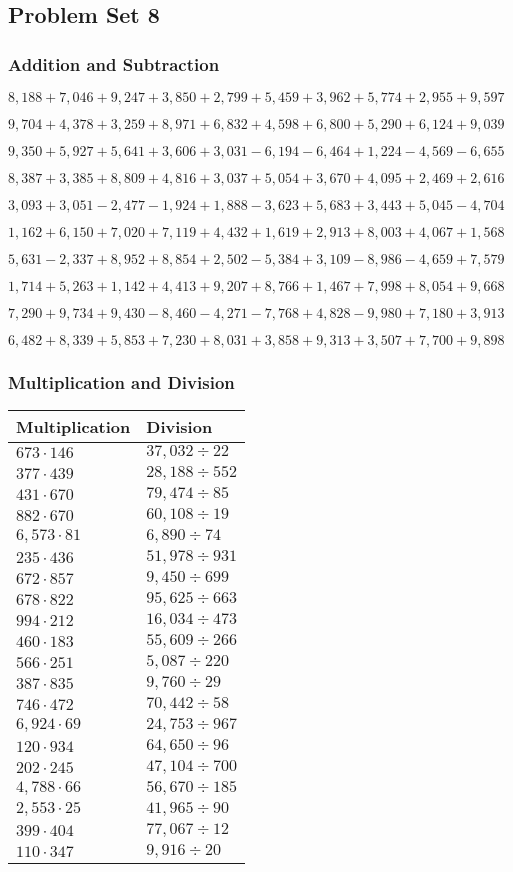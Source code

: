 \hypertarget{problem-set-8-3}{%
\subsection{Problem Set 8}\label{problem-set-8-3}}

\hypertarget{addition-and-subtraction-170}{%
\subsubsection{Addition and
Subtraction}\label{addition-and-subtraction-170}}

\(8,188+7,046+9,247+3,850+2,799+5,459+3,962+5,774+2,955+ 9,597\)

\(9,704+4,378+3,259+8,971+6,832+4,598+6,800+5,290+6,124+9,039\)

\(9,350+5,927+5,641+3,606+3,031-6,194-6,464+1,224-4,569-6,655\)

\(8,387+3,385+8,809+4,816+3,037+5,054+3,670+4,095+2,469+2,616\)

\(3,093+3,051-2,477-1,924+1,888-3,623+5,683+3,443+5,045-4,704\)

\(1,162+6,150+7,020+7,119+4,432+1,619+2,913+8,003+4,067+1,568\)

\(5,631-2,337+8,952+8,854+2,502-5,384+3,109-8,986-4,659+7,579\)

\(1,714+5,263+1,142+4,413+9,207+8,766+1,467+7,998+8,054+9,668\)

\(7,290+9,734+9,430-8,460-4,271-7,768+4,828-9,980+7,180+3,913\)

\(6,482+8,339+5,853+7,230+8,031+3,858+9,313+3,507+7,700+9,898\)

\hypertarget{multiplication-and-division-169}{%
\subsubsection{Multiplication and
Division}\label{multiplication-and-division-169}}

\begin{longtable}[]{@{}ll@{}}
\toprule
Multiplication & Division\tabularnewline
\midrule
\endhead
\(673\cdot146\) & \(37,032÷22\)\tabularnewline
\(377\cdot439\) & \(28,188÷552\)\tabularnewline
\(431\cdot670\) & \(79,474÷85\)\tabularnewline
\(882\cdot670\) & \(60,108÷19\)\tabularnewline
\(6,573\cdot81\) & \(6,890÷74\)\tabularnewline
\(235\cdot436\) & \(51,978÷931\)\tabularnewline
\(672\cdot857\) & \(9,450÷699\)\tabularnewline
\(678\cdot822\) & \(95,625÷663\)\tabularnewline
\(994\cdot212\) & \(16,034÷473\)\tabularnewline
\(460\cdot183\) & \(55,609÷266\)\tabularnewline
\(566\cdot251\) & \(5,087÷220\)\tabularnewline
\(387\cdot835\) & \(9,760÷29\)\tabularnewline
\(746\cdot472\) & \(70,442÷58\)\tabularnewline
\(6,924\cdot69\) & \(24,753÷967\)\tabularnewline
\(120\cdot934\) & \(64,650÷96\)\tabularnewline
\(202\cdot245\) & \(47,104÷700\)\tabularnewline
\(4,788\cdot66\) & \(56,670÷185\)\tabularnewline
\(2,553\cdot25\) & \(41,965÷90\)\tabularnewline
\(399\cdot404\) & \(77,067÷12\)\tabularnewline
\(110\cdot347\) & \(9,916÷20\)\tabularnewline
\bottomrule
\end{longtable}


